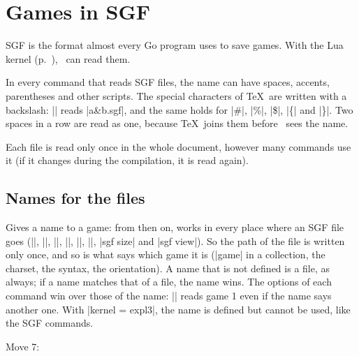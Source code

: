 \section{Games in SGF}
\label{subsec:sgf}

SGF is the format almost every Go program uses to save games. With the Lua kernel (p.~\pageref{subsec:kernel}), \pgfgoname\ can read them.

In every command that reads SGF files, the name can have spaces, accents, parentheses and other scripts. The special characters of \TeX\ are written with a backslash: || reads |a&b.sgf|, and the same holds for |\#|, |\%|, |\$|, |\{| and |\}|. Two spaces in a row are read as one, because \TeX\ joins them before \pgfgoname\ sees the name.

Each file is read only once in the whole document, however many commands use it (if it changes during the compilation, it is read again).

\subsection{Names for the files}
\label{subsec:sgfnombres}

\begin{command}{\pgfgodefinesgf{}}
	Gives a name to a game: from then on,  works in every place where an SGF file goes (|\sgf|, |\sgfinfo|, |\sgfcomment|, |\sgfdiagrams|, |\sgfproblem|, |\sgfanimation|, |sgf size| and |sgf view|). So the path of the file is written only once, and so is what says which game it is (|game| in a collection, the charset, the syntax, the orientation). A name that is not defined is a file, as always; if a name matches that of a file, the name wins. The options of each command win over those of the name: || reads game 1 even if the name says another one. With |kernel = expl3|, the name is defined but cannot be used, like the SGF commands.

	\begin{codeexample}[]

		\begin{goban}[sgf size = game, scale = 0.6]
		\end{goban}

		Move 7: 
	\end{codeexample}
\end{command}

